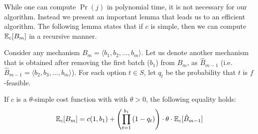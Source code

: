 	While one can compute $\Pr(j)$ in polynomial time, it is not necessary for our algorithm. Instead we present an important lemma that leads us to an efficient algorithm. The following lemma states that if $c$ is simple, then we can compute $\mathbb{E}_c[B_{m}]$ in a recursive manner.
	\begin{lemma} \label{bdoodle:lemma:recurrence}
		Consider any mechanism $B_m = \langle b_1, b_2, \dots, b_m \rangle$. Let us denote another mechanism that is obtained after removing the first batch ($b_1$) from $B_m$, as $\hat{B}_{m-1}$ (i.e. $\hat{B}_{m-1} = \langle b_2, b_3, \dots, b_m \rangle$). For each option $t \in S$, let $q_t$ be the probability that $t$ is $f$-feasible.

	If $c$ is a $\theta$-simple cost function with with $\theta > 0$, the following equality holds:
	\begin{equation} \label{bdoodle:eqn:recurrence}
	\mathbb{E}_c[B_{m}] = c(1, b_1) +  \left(\prod_{t=1}^{b_1} \left(1 - q_t\right)\right) \cdot \theta \cdot \mathbb{E}_c[\hat{B}_{m-1}]
	\end{equation}
	\end{lemma}

